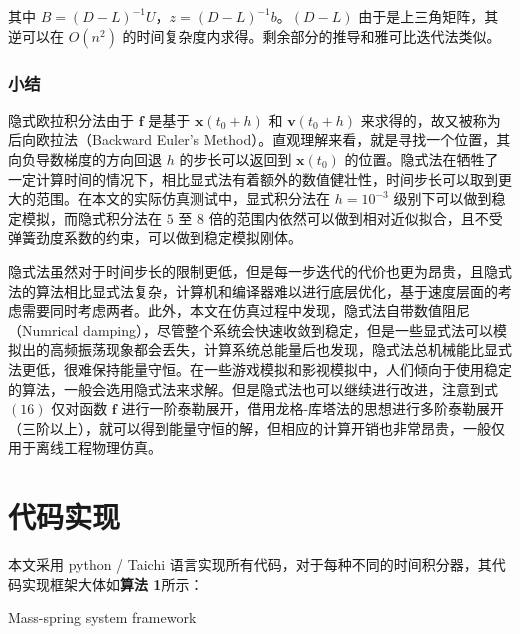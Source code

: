 \documentclass[UTF8]{ctexart}
\begin{document}
其中 $B = (D - L)^{-1} U$，$z = (D - L)^{-1} b$。$(D - L)$ 由于是上三角矩阵，其逆可以在 $O(n^2)$ 的时间复杂度内求得。剩余部分的推导和雅可比迭代法类似。

\subsubsection{小结}

隐式欧拉积分法由于 $\mathbf{f}$ 是基于 $\mathbf{x}(t_0 + h)$ 和 $\mathbf{v}(t_0 + h)$ 来求得的，故又被称为后向欧拉法（Backward Euler's Method）。直观理解来看，就是寻找一个位置，其向负导数梯度的方向回退 $h$ 的步长可以返回到 $\mathbf{x}(t_0)$ 的位置。隐式法在牺牲了一定计算时间的情况下，相比显式法有着额外的数值健壮性，时间步长可以取到更大的范围。在本文的实际仿真测试中，显式积分法在 $h = 10^{-3}$ 级别下可以做到稳定模拟，而隐式积分法在 $5$ 至 $8$ 倍的范围内依然可以做到相对近似拟合，且不受弹簧劲度系数的约束，可以做到稳定模拟刚体。 \par

隐式法虽然对于时间步长的限制更低，但是每一步迭代的代价也更为昂贵，且隐式法的算法相比显式法复杂，计算机和编译器难以进行底层优化，基于速度层面的考虑需要同时考虑两者。此外，本文在仿真过程中发现，隐式法自带数值阻尼（Numrical damping），尽管整个系统会快速收敛到稳定，但是一些显式法可以模拟出的高频振荡现象都会丢失，计算系统总能量后也发现，隐式法总机械能比显式法更低，很难保持能量守恒。在一些游戏模拟和影视模拟中，人们倾向于使用稳定的算法，一般会选用隐式法来求解。但是隐式法也可以继续进行改进，注意到式 $(16)$ 仅对函数 $\mathbf{f}$ 进行一阶泰勒展开，借用龙格-库塔法的思想进行多阶泰勒展开（三阶以上），就可以得到能量守恒的解，但相应的计算开销也非常昂贵，一般仅用于离线工程物理仿真。


\section{代码实现}
本文采用 python / Taichi 语言实现所有代码，对于每种不同的时间积分器，其代码实现框架大体如\textbf{算法 1}所示：

\begin{algorithm}
\caption{Mass-spring system framework}  
\label{alg: Mass-spring system framework} 
\begin{algorithmic} [1] 
		\State {}
				\State {}
			\EndFor
		\EndIf
		\State {}
		\EndFor
	\EndFunction  
\end{algorithmic}
\end{algorithm}
\end{document}
